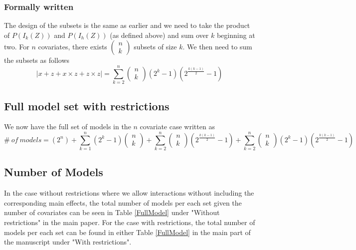 \subsubsection{Formally written}
The design of the subsets is the same as earlier and we need to take the product of
$P\left(I_k\left(Z\right)\right)$ and $P\left(I_h\left(Z\right)\right)$ (as defined above) and sum over $k$ beginning at two.
For $n$ covariates, there exists $\left( \begin{array}{c}
n \\ 
k \end{array}
\right)$ subsets of size $k$. We then need to sum the subsets as follows
\[|x + z + x \times z+z \times z|=\sum^n_{k=2}{\left( \begin{array}{c}
n \\ 
k \end{array}
\right)\left(2^k-1\right)\left(2^{\frac{k\left(k-1\right)}{2}}-1\right)}\] 

\subsection{Full model set with restrictions}
We now have the full set of models in the $n$ covariate case written as
\[\#\ of\ models=\left(2^n\right)+\sum^n_{k=1}{\left(2^k-1\right)\left( \begin{array}{c}
n \\ 
k \end{array}
\right)}+\sum^n_{k=2}{\left( \begin{array}{c}
n \\ 
k \end{array}
\right)\left(2^{\frac{k\left(k-1\right)}{2}}-1\right)}+\sum^n_{k=2}{\left( \begin{array}{c}
n \\ 
k \end{array}
\right)\left(2^k-1\right)\left(2^{\frac{k\left(k-1\right)}{2}}-1\right)}\] 

\subsection{Number of Models}
In the case without restrictions where we allow interactions without including the corresponding main effects, the total number of models per each set given the number of covariates can be seen in Table \ref{FullModel} under "Without restrictions" in the main paper. For the case with restrictions, the total number of models per each set can be found in either Table \ref{FullModel} in the main part of the manuscript under "With restrictions". 



